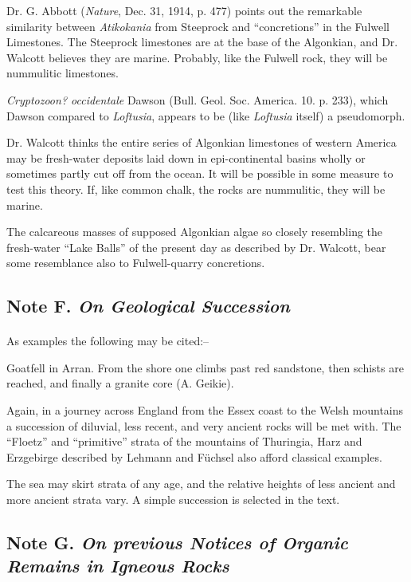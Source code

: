 \documentclass[a4paper, 12pt, oneside]{article}
\begin{document}
Dr. G. Abbott (\emph{Nature}, Dec. 31, 1914, p. 477) points out the remarkable similarity between \emph{Atikokania} from Steeprock and ``concretions'' in the Fulwell Limestones. The Steeprock limestones are at the base of the Algonkian, and Dr. Walcott believes they are marine. Probably, like the Fulwell rock, they will be nummulitic limestones.

\emph{Cryptozoon? occidentale} Dawson (Bull. Geol. Soc. America. 10. p. 233), which Dawson compared to \emph{Loftusia}, appears to be (like \emph{Loftusia} itself) a pseudomorph.

Dr. Walcott thinks the entire series of Algonkian limestones of western America may be fresh-water deposits laid down in epi-continental basins wholly or sometimes partly cut off from the ocean. It will be possible in some measure to test this theory. If, like common chalk, the rocks are nummulitic, they will be marine.

The calcareous masses of supposed Algonkian algae so closely resembling the fresh-water ``Lake Balls'' of the present day as described by Dr. Walcott, bear some resemblance also to Fulwell-quarry concretions.

\subsection{Note F. \emph{On Geological Succession}}
\paragraph{}
As examples the following may be cited:--

Goatfell in Arran. From the shore one climbs past red sandstone, then schists are reached, and finally a granite core (A. Geikie).

Again, in a journey across England from the Essex coast to the Welsh mountains a succession of diluvial, less recent, and very ancient rocks will be met with. The ``Floetz'' and ``primitive'' strata of the mountains of Thuringia, Harz and Erzgebirge described by Lehmann and Füchsel also afford classical examples.

The sea may skirt strata of any age, and the relative heights of less ancient and more ancient strata vary. A simple succession is selected in the text.

\subsection{Note G. \emph{On previous Notices of Organic Remains in Igneous Rocks}}
\end{document}
